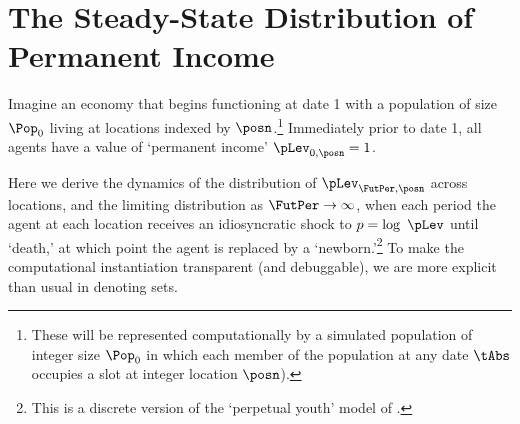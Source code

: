 \documentclass[../BufferStockTheory.tex]{subfiles}\usepackage{ApndxSteadyState}
\begin{document}
  \section{The Steady-State Distribution of Permanent Income}
  \Biggen
  Imagine an economy that begins functioning at date 1 with a population of size $\Pop_{0}$ living at locations indexed by  $\posn$.\footnote{These will be represented computationally by a simulated population of integer size $\Pop_{0}$ in which each member of the population at any date $\tAbs$ occupies a slot at integer location $\posn$).}  Immediately prior to date 1, all agents have a value of `permanent income' $\pLev_{0,\posn}=1$. 

  Here we derive the dynamics of the distribution of $\pLev_{\FutPer,\posn}$ across locations, and the limiting distribution as $\FutPer \rightarrow \infty$, when each period the agent at each location receives an idiosyncratic shock to $\pLog = \log ~ \pLev$ until `death,' at which point the agent is replaced by a `newborn.'\footnote{This is a discrete version of the `perpetual youth' model of  \cite{blanchardFinite}.} To make the computational instantiation transparent (and debuggable), we are more explicit than usual in denoting sets.

\end{document}
